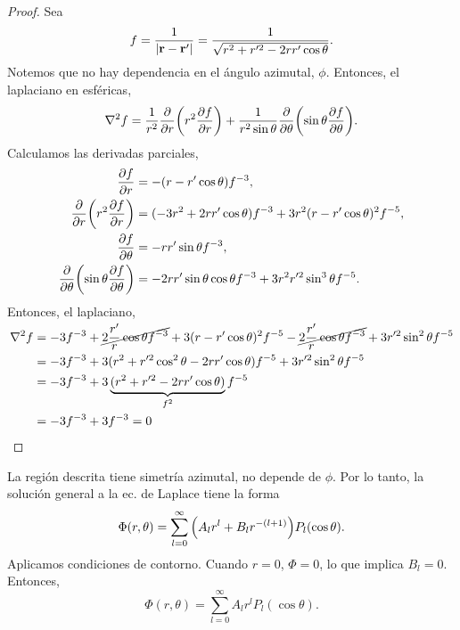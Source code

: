 \documentclass[11pt]{article}
\theoremstyle{definition}
\numberwithin{equation}{section}
\begin{document}
\begin{proof}
    Sea 
    \begin{equation}
        f = \frac{1}{|\vb{r} - \vb{r'}|} = \frac{1}{\sqrt{r^2+r'^2-2rr'\cos\theta}}.
    \end{equation}
    Notemos que no hay dependencia en el ángulo azimutal, $\phi$. Entonces, el laplaciano en esféricas,
    \begin{equation}
        \laplacian f = \frac{1}{r^2}\pdv{r}\pqty{r^2\pdv{f}{r}} + \frac{1}{r^2\sin\theta}\pdv{\theta}\pqty{\sin\theta\pdv{f}{\theta}}.
    \end{equation}
    Calculamos las derivadas parciales,
    \begin{align}
        \pdv{f}{r} &= -(r-r'\cos\theta)f^{-3},\\
        \pdv{r}\pqty{r^2\pdv{f}{r}} &= (-3r^2+2rr'\cos\theta)f^{-3} + 3r^2(r-r'\cos\theta)^2f^{-5},\\
        \pdv{f}{\theta} &= -rr'\sin\theta f^{-3},\\ 
        \pdv{\theta}\pqty{\sin\theta\pdv{f}{\theta}} &= -2rr'\sin\theta\cos\theta f^{-3} + 3r^2r'^2\sin^3\theta f^{-5}.
    \end{align} 
    Entonces, el laplaciano,
    \begin{equation}
        \begin{split}
            \laplacian f &= -3f^{-3} + \cancel{2\frac{r'}{r}\cos\theta f^{-3}} + 3(r-r'\cos\theta)^2f^{-5} - \cancel{2\frac{r'}{r}\cos\theta f^{-3}} + 3r'^2\sin^2\theta f^{-5} \\
            &= -3f^{-3} + 3(r^2 + r'^2\cos^2\theta -2rr'\cos\theta)f^{-5} + 3r'^2\sin^2\theta f^{-5}\\ 
            &= -3f^{-3} + 3\underbrace{(r^2 + r'^2 -2rr'\cos\theta)}_{f^2}f^{-5}\\ 
            &= -3f^{-3} + 3f^{-3} = 0
        \end{split}
    \end{equation}
\end{proof}
La región descrita tiene simetría azimutal, no depende de $\phi$. Por lo tanto, la solución general a la ec. de Laplace tiene la forma
\begin{equation}
    \Phi(r,\theta) = \sum_{l=0}^{\infty}\pqty{A_l r^l + B_l r^{-(l+1)}}P_l(\cos\theta).
\end{equation}
Aplicamos condiciones de contorno. Cuando $r=0$, $\Phi = 0$, lo que implica $B_l = 0$. Entonces,
\begin{equation}
    \Phi(r,\theta) = \sum_{l=0}^{\infty}A_l r^lP_l(\cos\theta).
\end{equation}
\end{document}
